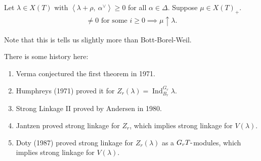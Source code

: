\begin{theorem}

\begin{theorem}

Let \(\lambda \in X(T)\) with
\({\left\langle {\lambda + \rho},~{\alpha^\vee} \right\rangle} \geq 0\)
for all \(\alpha\in \Delta\). Suppose \(\mu \in X(T)_+\).
\begin{align*} [H^i w\cdot \lambda : L(\mu)] \neq 0 \text{ for some } i\geq 0 \implies \mu \uparrow \lambda .\end{align*}

\end{theorem}

\end{theorem}

\begin{remark}

\begin{remark}

Note that this is tells us slightly more than Bott-Borel-Weil.

\end{remark}

\end{remark}

\begin{remark}

\begin{remark}

There is some history here:

\begin{enumerate}
\def\labelenumi{\arabic{enumi}.}
\item
  Verma conjectured the first theorem in 1971.
\item
  Humphreys (1971) proved it for
  \(Z_r(\lambda) = \operatorname{Ind}_{B_r}^{G_r} \lambda\).
\item
  Strong Linkage II proved by Andersen in 1980.
\item
  Jantzen proved strong linkage for \(Z_r\), which implies strong
  linkage for \(V(\lambda)\).
\item
  Doty (1987) proved strong linkage for \(Z_r(\lambda)\) as a
  \(G_rT{\hbox{-}}\)modules, which implies strong linkage for
  \(V(\lambda)\).
\end{enumerate}

\end{remark}

\end{remark}

